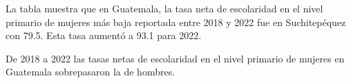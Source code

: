 La tabla muestra que en Guatemala, la tasa neta de escolaridad en el nivel primario de mujeres más baja reportada entre 2018 y 2022 fue en Suchitepéquez con 79.5. Esta tasa aumentó a 93.1 para 2022.

De 2018 a 2022 las tasas netas de escolaridad en el nivel primario de mujeres en Guatemala sobrepasaron la de hombres. 